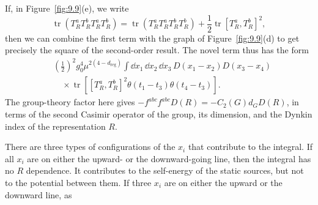 If, in Figure~\ref{fig:9.9}(e), we write
\[
  \operatorname{tr}(T_R^aT_R^bT_R^aT_R^b)
  =\operatorname{tr}(T_R^aT_R^aT_R^bT_R^b)
  +\frac12\operatorname{tr}[T_R^a,T_R^b]^2,
\]
then we can combine the first term with the graph of Figure~\ref{fig:9.9}(d)
to get precisely the square of the second-order result. The novel term thus
has the form
\[
\begin{aligned}
&\left(\frac12\right)^2g_0^4\mu^{2(4-d_{\mathrm{reg}})}
 \int\dd x_1\,\dd x_2\,\dd x_3\,
 D(x_1-x_2)D(x_3-x_4)\\[-2pt]
&\quad\times\operatorname{tr}\!\left[
 [T_R^a,T_R^b]^2\theta(t_1-t_3)\theta(t_4-t_3)\right].
\end{aligned}
\]
The group-theory factor here gives $-f^{abc}f^{abc}D(R)=-C_2(G)d_GD(R)$,
in terms of the second Casimir operator of the group, its dimension, and the
Dynkin index of the representation $R$.

There are three types of configurations of the $x_i$ that contribute to the
integral. If all $x_i$ are on either the upward- or the downward-going line,
then the integral has no $R$ dependence. It contributes to the self-energy of
the static sources, but not to the potential between them. If three $x_i$ are
on either the upward or the downward line, as

